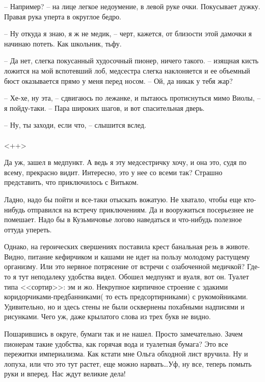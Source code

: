 \documentclass[a4paper]{book}
\begin{document}
-- Например? -- на лице легкое недоумение, в левой руке очки. Покусывает дужку. Правая рука уперта в округлое бедро.

-- Ну откуда я знаю, я ж не медик, -- черт, кажется, от близости этой дамочки я начинаю потеть. Как школьник, тьфу.

-- Да нет, слегка покусанный худосочный пионер, ничего такого. -- изящная кисть ложится на мой вспотевший лоб, медсестра слегка наклоняется и  ее объемный бюст оказывается прямо у меня перед носом. --  Ой, да никак у тебя жар?

-- Хе-хе, ну эта, -- сдвигаюсь по лежанке, и пытаюсь протиснуться мимо Виолы, -- я пойду-таки. -- Пара широких шагов, и вот спасительная дверь.

-- Ну, ты заходи, если что, -- слышится вслед.
\\
\paragraph{}<++>

Да уж, зашел в медпункт. А ведь я эту медсестричку хочу, и она это, судя по всему, прекрасно видит. Интересно, это у нее со всеми так? Страшно представить, что приключилось с Витьком. 

Ладно, надо бы пойти и все-таки отыскать вожатую. Не хватало, чтобы еще кто-нибудь отправился на встречу приключениям. Да и вооружиться посерьезнее не помешает. Надо бы в Кузьмичовье логово наведаться и что-нибудь полезное оттуда упереть.

Однако, на героических свершениях поставила крест банальная резь в животе. Видно, питание кефирчиком и кашами не идет на пользу молодому растущему организму. Или это нервное потрясение от встречи с озабоченной медичкой? Где-то я тут неподалеку удобства видел. Обошел медпункт и вуаля, вот он. Туалет типа <<сортир>>: эм и жо. Некрупное кирпичное строение с эдакими коридорчиками-предбанниками( то есть предсортирниками) с рукомойниками. Удивительно, но и здесь стены не были осквернены похабными надписями и рисунками. Чего уж, даже крылатого слова из трех букв не видно. 

Пошарившись в округе, бумаги так и не нашел. Просто замечательно. Зачем пионерам такие удобства, как горячая вода и туалетная бумага? Это все пережитки империализма. Как кстати мне Ольга обходной лист вручила. Ну и лопуха, или что это тут растет,  еще можно нарвать\ldots Уф, ну все, теперь помыть руки и вперед. Нас ждут великие дела!
\end{document}
